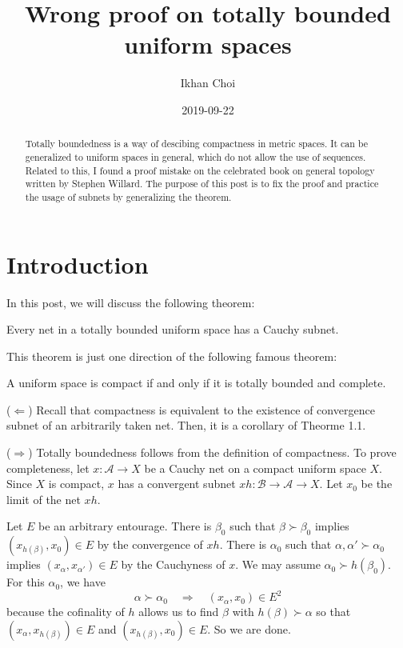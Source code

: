 \documentclass[11pt]{amsart}
\title{Wrong proof on totally bounded uniform spaces}
\author{Ikhan Choi}
\date{2019-09-22}
\begin{document}
\maketitle

\begin{abstract}
Totally boundedness is a way of descibing compactness in metric spaces.
It can be generalized to uniform spaces in general, which do not allow the use of sequences.
Related to this, I found a proof mistake on the celebrated book on general topology written by Stephen Willard.
The purpose of this post is to fix the proof and practice the usage of subnets by generalizing the theorem.
\end{abstract}


\section{Introduction}

In this post, we will discuss the following theorem:

\begin{thm}
Every net in a totally bounded uniform space has a Cauchy subnet.
\end{thm}
This theorem is just one direction of the following famous theorem:

\begin{thm}
A uniform space is compact if and only if it is totally bounded and complete.
\end{thm}

\begin{pf}
($\Leftarrow$)
Recall that compactness is equivalent to the existence of convergence subnet of an arbitrarily taken net.
Then, it is a corollary of Theorme 1.1.

($\Rightarrow$)
Totally boundedness follows from the definition of compactness.
To prove completeness, let $x:\mathcal{A}\to X$ be a Cauchy net on a compact uniform space $X$.
Since $X$ is compact, $x$ has a convergent subnet $xh:\mathcal{B}\to\mathcal{A}\to X$.
Let $x_0$ be the limit of the net $xh$.

Let $E$ be an arbitrary entourage.
There is $\beta_0$ such that $\beta\succ\beta_0$ implies $(x_{h(\beta)},x_0)\in E$ by the convergence of $xh$.
There is $\alpha_0$ such that $\alpha,\alpha'\succ\alpha_0$ implies $(x_\alpha,x_{\alpha'})\in E$ by the Cauchyness of $x$.
We may assume $\alpha_0\succ h(\beta_0)$.
For this $\alpha_0$, we have
\[\alpha\succ\alpha_0\quad\Rightarrow\quad(x_\alpha,x_0)\in E^2\]
because the cofinality of $h$ allows us to find $\beta$ with $h(\beta)\succ\alpha$ so that $(x_\alpha,x_{h(\beta)})\in E$ and $(x_{h(\beta)},x_0)\in E$.
So we are done.
\end{pf}
\end{document}
